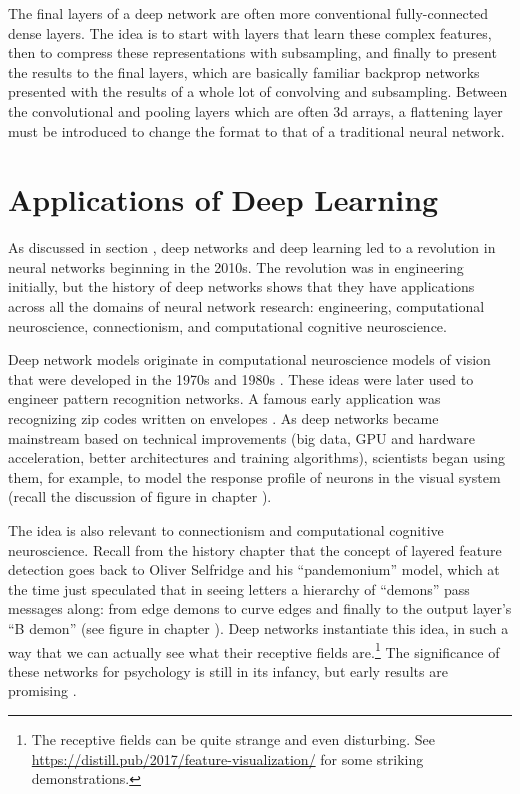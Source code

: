 The final layers of a deep network are often more conventional fully-connected dense layers. The idea is to start with layers that learn these complex features, then to compress these representations with subsampling, and finally to present the results to the final layers, which are basically familiar backprop networks presented with the results of a whole lot of convolving and subsampling. Between the convolutional and pooling layers which are often 3d arrays, a flattening layer must be introduced to change the format to that of a traditional neural network.

\section{Applications of Deep Learning}

 
As discussed in section , deep networks and deep learning led to a revolution in neural networks beginning in the 2010s. The revolution was in engineering initially, but the history of deep networks shows that they have applications across all the domains of neural network research: engineering, computational neuroscience, connectionism, and computational cognitive neuroscience. 

Deep network models originate in  computational neuroscience models of vision that were developed in the 1970s and 1980s \cite{fukushima1982neocognitron}.  These ideas were later used to engineer pattern recognition networks. A famous early application was recognizing zip codes written on envelopes \cite{lecun1989backpropagation}. As deep networks became mainstream based on technical improvements (big data, GPU and hardware acceleration, better architectures and training algorithms), scientists began using them, for example, to model the response profile of neurons in the visual system (recall the discussion of figure  in chapter ). 

The idea is also relevant to connectionism and computational cognitive neuroscience. Recall from the history chapter that the concept of layered feature detection goes back to Oliver Selfridge and his ``pandemonium'' model, which at the time just speculated that in seeing letters a hierarchy of ``demons'' pass messages along: from edge demons to curve edges and finally to the output layer's ``B demon'' (see figure  in chapter ). Deep networks instantiate this idea, in such a way that we can actually  see what their receptive fields are.\footnote{The receptive fields can be quite strange and even disturbing. See \url{https://distill.pub/2017/feature-visualization/} for some striking demonstrations.}  The significance of these networks for psychology is still in its infancy, but early results are promising \cite{zorzi2013modeling, ritter2017cognitive}.
